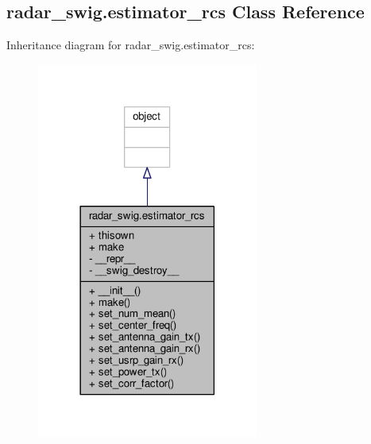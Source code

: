 \subsection{radar\+\_\+swig.\+estimator\+\_\+rcs Class Reference}
\label{classradar__swig_1_1estimator__rcs}


Inheritance diagram for radar\+\_\+swig.\+estimator\+\_\+rcs\+:
\nopagebreak
\begin{figure}[H]
\begin{center}
\leavevmode
\includegraphics[width=206pt]{d9/d0b/classradar__swig_1_1estimator__rcs__inherit__graph}
\end{center}
\end{figure}


